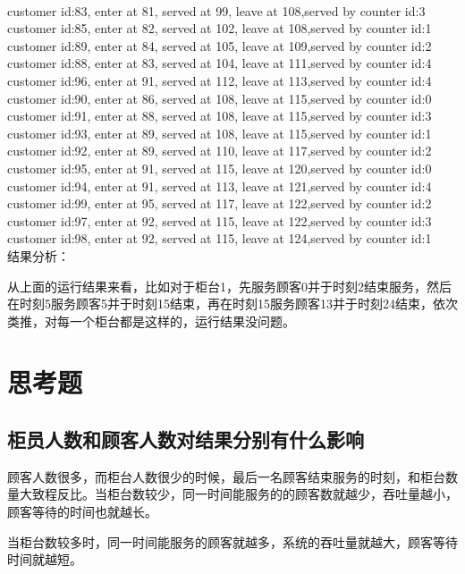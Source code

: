 \documentclass[UTF8]{ctexart}
\begin{document}
\\
customer id:83, enter at 81, served at 99, leave at 108,served by counter id:3
\\
customer id:85, enter at 82, served at 102, leave at 108,served by counter id:1
\\
customer id:89, enter at 84, served at 105, leave at 109,served by counter id:2
\\
customer id:88, enter at 83, served at 104, leave at 111,served by counter id:4
\\
customer id:96, enter at 91, served at 112, leave at 113,served by counter id:4
\\
customer id:90, enter at 86, served at 108, leave at 115,served by counter id:0
\\
customer id:91, enter at 88, served at 108, leave at 115,served by counter id:3
\\
customer id:93, enter at 89, served at 108, leave at 115,served by counter id:1
\\
customer id:92, enter at 89, served at 110, leave at 117,served by counter id:2
\\
customer id:95, enter at 91, served at 115, leave at 120,served by counter id:0
\\
customer id:94, enter at 91, served at 113, leave at 121,served by counter id:4
\\
customer id:99, enter at 95, served at 117, leave at 122,served by counter id:2
\\
customer id:97, enter at 92, served at 115, leave at 122,served by counter id:3
\\
customer id:98, enter at 92, served at 115, leave at 124,served by counter id:1
\\

结果分析：\par
从上面的运行结果来看，比如对于柜台1，先服务顾客0并于时刻2结束服务，然后在时刻5服务顾客5并于时刻15结束，再在时刻15服务顾客13并于时刻24结束，依次类推，对每一个柜台都是这样的，运行结果没问题。\par

\section{思考题}

\subsection{柜员人数和顾客人数对结果分别有什么影响}
顾客人数很多，而柜台人数很少的时候，最后一名顾客结束服务的时刻，和柜台数量大致程反比。当柜台数较少，同一时间能服务的的顾客数就越少，吞吐量越小，顾客等待的时间也就越长。\par
当柜台数较多时，同一时间能服务的顾客就越多，系统的吞吐量就越大，顾客等待时间就越短。\par
\end{document}
